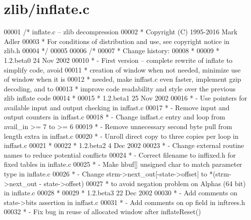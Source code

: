 \hypertarget{zlib_2inflate_8c_source}{}\section{zlib/inflate.c}
\label{zlib_2inflate_8c_source}

\begin{DoxyCode}
00001 \textcolor{comment}{/* inflate.c -- zlib decompression}
00002 \textcolor{comment}{ * Copyright (C) 1995-2016 Mark Adler}
00003 \textcolor{comment}{ * For conditions of distribution and use, see copyright notice in zlib.h}
00004 \textcolor{comment}{ */}
00005 
00006 \textcolor{comment}{/*}
00007 \textcolor{comment}{ * Change history:}
00008 \textcolor{comment}{ *}
00009 \textcolor{comment}{ * 1.2.beta0    24 Nov 2002}
00010 \textcolor{comment}{ * - First version -- complete rewrite of inflate to simplify code, avoid}
00011 \textcolor{comment}{ *   creation of window when not needed, minimize use of window when it is}
00012 \textcolor{comment}{ *   needed, make inffast.c even faster, implement gzip decoding, and to}
00013 \textcolor{comment}{ *   improve code readability and style over the previous zlib inflate code}
00014 \textcolor{comment}{ *}
00015 \textcolor{comment}{ * 1.2.beta1    25 Nov 2002}
00016 \textcolor{comment}{ * - Use pointers for available input and output checking in inffast.c}
00017 \textcolor{comment}{ * - Remove input and output counters in inffast.c}
00018 \textcolor{comment}{ * - Change inffast.c entry and loop from avail\_in >= 7 to >= 6}
00019 \textcolor{comment}{ * - Remove unnecessary second byte pull from length extra in inffast.c}
00020 \textcolor{comment}{ * - Unroll direct copy to three copies per loop in inffast.c}
00021 \textcolor{comment}{ *}
00022 \textcolor{comment}{ * 1.2.beta2    4 Dec 2002}
00023 \textcolor{comment}{ * - Change external routine names to reduce potential conflicts}
00024 \textcolor{comment}{ * - Correct filename to inffixed.h for fixed tables in inflate.c}
00025 \textcolor{comment}{ * - Make hbuf[] unsigned char to match parameter type in inflate.c}
00026 \textcolor{comment}{ * - Change strm->next\_out[-state->offset] to *(strm->next\_out - state->offset)}
00027 \textcolor{comment}{ *   to avoid negation problem on Alphas (64 bit) in inflate.c}
00028 \textcolor{comment}{ *}
00029 \textcolor{comment}{ * 1.2.beta3    22 Dec 2002}
00030 \textcolor{comment}{ * - Add comments on state->bits assertion in inffast.c}
00031 \textcolor{comment}{ * - Add comments on op field in inftrees.h}
00032 \textcolor{comment}{ * - Fix bug in reuse of allocated window after inflateReset()}

\end{DoxyCode}
